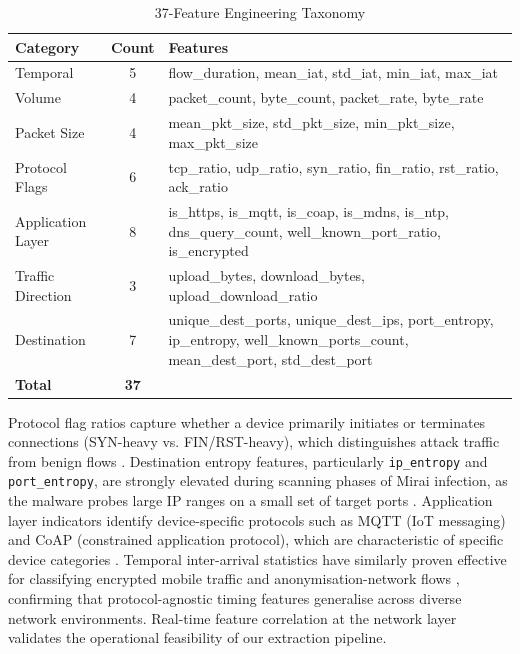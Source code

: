 \documentclass[conference]{IEEEtran}
\begin{document}
\begin{table}[htbp]
\caption{37-Feature Engineering Taxonomy}
\label{tab:features}
\centering
\renewcommand{\arraystretch}{1.2}
\begin{tabular}{l c p{4.0cm}}
\toprule
\textbf{Category}        & \textbf{Count} & \textbf{Features} \\
\midrule
Temporal                 & 5  & flow\_duration, mean\_iat, std\_iat, min\_iat, max\_iat \\
Volume                   & 4  & packet\_count, byte\_count, packet\_rate, byte\_rate \\
Packet Size              & 4  & mean\_pkt\_size, std\_pkt\_size, min\_pkt\_size, max\_pkt\_size \\
Protocol Flags           & 6  & tcp\_ratio, udp\_ratio, syn\_ratio, fin\_ratio, rst\_ratio, ack\_ratio \\
Application Layer        & 8  & is\_https, is\_mqtt, is\_coap, is\_mdns, is\_ntp, dns\_query\_count, well\_known\_port\_ratio, is\_encrypted \\
Traffic Direction        & 3  & upload\_bytes, download\_bytes, upload\_download\_ratio \\
Destination              & 7  & unique\_dest\_ports, unique\_dest\_ips, port\_entropy, ip\_entropy, well\_known\_ports\_count, mean\_dest\_port, std\_dest\_port \\
\midrule
\textbf{Total}           & \textbf{37} & \\
\bottomrule
\end{tabular}
\end{table}

Protocol flag ratios capture whether a device primarily initiates or
terminates connections (SYN-heavy vs. FIN/RST-heavy), which distinguishes
attack traffic from benign flows \cite{buczak2016survey}. Destination
entropy features, particularly \texttt{ip\_entropy} and
\texttt{port\_entropy}, are strongly elevated during scanning phases of
Mirai infection, as the malware probes large IP ranges on a small set of
target ports \cite{antonakakis2017understanding}. Application layer
indicators identify device-specific protocols such as MQTT (IoT messaging)
and CoAP (constrained application protocol), which are characteristic of
specific device categories \cite{sivanathan2019classifying}. Temporal
inter-arrival statistics have similarly proven effective for classifying
encrypted mobile traffic \cite{aceto2019mimetic} and anonymisation-network
flows \cite{habibi2017characterization}, confirming that protocol-agnostic
timing features generalise across diverse network environments. Real-time
feature correlation at the network layer \cite{tian2020realtime} validates
the operational feasibility of our extraction pipeline.
\end{document}
